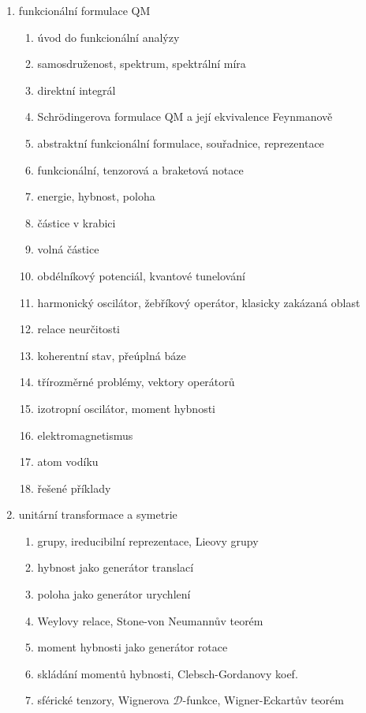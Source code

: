 \documentclass[10pt,a4paper]{report}
\theoremstyle{definition}
\begin{document}
\begin{enumerate}
    \item funkcionální formulace QM
    \begin{enumerate}
        \item úvod do funkcionální analýzy
        \item samosdruženost, spektrum, spektrální míra
        \item direktní integrál
        \item Schrödingerova formulace QM a její ekvivalence Feynmanově
        \item abstraktní funkcionální formulace, souřadnice, reprezentace
        \item funkcionální, tenzorová a braketová notace
        \item energie, hybnost, poloha
        \item částice v krabici
        \item volná částice
        \item obdélníkový potenciál, kvantové tunelování
        \item harmonický oscilátor, žebříkový operátor, klasicky zakázaná oblast
        \item relace neurčitosti
        \item koherentní stav, přeúplná báze
        \item třírozměrné problémy, vektory operátorů
        \item izotropní oscilátor, moment hybnosti
        \item elektromagnetismus
        \item atom vodíku
        \item řešené příklady
    \end{enumerate}
    
    \item unitární transformace a symetrie
    \begin{enumerate}
        \item grupy, ireducibilní reprezentace, Lieovy grupy
        \item hybnost jako generátor translací
        \item poloha jako generátor urychlení
        \item Weylovy relace, Stone-von Neumannův teorém
        \item moment hybnosti jako generátor rotace
        \item skládání momentů hybnosti, Clebsch-Gordanovy koef.
        \item sférické tenzory, Wignerova $\mathscr{D}$-funkce, Wigner-Eckartův teorém
    \end{enumerate}
    

\end{enumerate}
\end{document}

